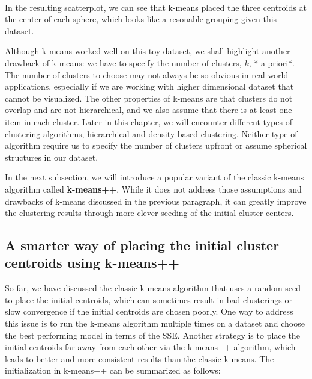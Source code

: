 \documentclass[11pt]{article}
\begin{document}
    \begin{center}
    \end{center}
    { \hspace*{\fill} \\}
    
    In the resulting scatterplot, we can see that k-means placed the three
centroids at the center of each sphere, which looks like a resonable
grouping given this dataset.

    Although k-means worked well on this toy dataset, we shall highlight
another drawback of k-means: we have to specify the number of clusters,
\(k\), * a priori*. The number of clusters to choose may not always be
so obvious in real-world applications, especially if we are working with
higher dimensional dataset that cannot be visualized. The other
properties of k-means are that clusters do not overlap and are not
hierarchical, and we also assume that there is at least one item in each
cluster. Later in this chapter, we will encounter different types of
clustering algorithms, hierarchical and density-based clustering.
Neither type of algorithm require us to specify the number of clusters
upfront or assume spherical structures in our dataset.

    In the next subsection, we will introduce a popular variant of the
classic k-means algorithm called \textbf{k-means++}. While it does not
address those assumptions and drawbacks of k-means discussed in the
previous paragraph, it can greatly improve the clustering results
through more clever seeding of the initial cluster centers.

    \subsection{A smarter way of placing the initial cluster centroids using
k-means++}\label{a-smarter-way-of-placing-the-initial-cluster-centroids-using-k-means}

    So far, we have discussed the classic k-means algorithm that uses a
random seed to place the initial centroids, which can sometimes result
in bad clusterings or slow convergence if the initial centroids are
chosen poorly. One way to address this issue is to run the k-means
algorithm multiple times on a dataset and choose the best performing
model in terms of the SSE. Another strategy is to place the initial
centroids far away from each other via the k-means++ algorithm, which
leads to better and more consistent results than the classic k-means.
The initialization in k-means++ can be summarized as follows:
\end{document}
